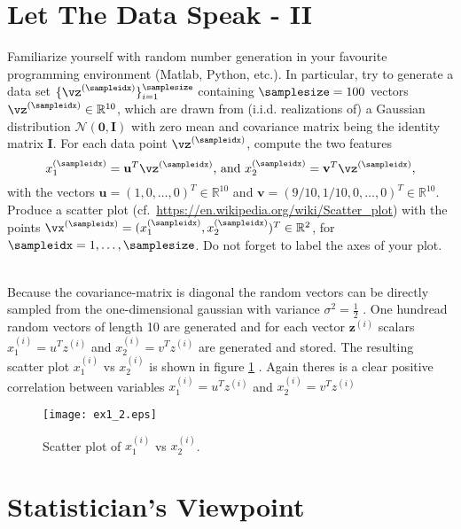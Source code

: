 \documentclass[article,11pt]{article}
\begin{document}
\newpage
\section{Let The Data Speak - II}
Familiarize yourself with random number generation in your favourite 
programming environment (Matlab, Python, etc.). In particular, try to generate a data set 
$\{ \vz^{(\sampleidx)} \}_{i=1}^{\samplesize}$ containing $\samplesize=100$ vectors $\vz^{(\sampleidx)} \in \mathbb{R}^{10}$, which 
are drawn from (i.i.d. realizations of) a Gaussian distribution $\mathcal{N}(\mathbf{0},\mathbf{I})$ with zero mean and covariance 
matrix being the identity matrix $\mathbf{I}$. For each data point $\vz^{(\sampleidx)}$, compute the two 
features 
\begin{equation}
x_{1}^{(\sampleidx)} = \mathbf{u}^{T} \vz^{(\sampleidx)} \mbox{, and } x_{2}^{(\sampleidx)}= \mathbf{v}^{T} \vz^{(\sampleidx)}, 
\end{equation}
with the vectors $\mathbf{u}\!=\!(1,0,\ldots,0)^{T}\in \mathbb{R}^{10}$ and $\mathbf{v}\!=\!(9/10,1/10,0,\ldots,0)^{T}\in \mathbb{R}^{10}$. 
Produce a scatter plot (cf.\ \url{https://en.wikipedia.org/wiki/Scatter_plot}) with the points 
$\vx^{(\sampleidx)}=(x^{(\sampleidx)}_{1},x^{(\sampleidx)}_{2})^{T} \in \mathbb{R}^{2}$, for $\sampleidx=1,\ldots,\samplesize$. 
Do not forget to label the axes of your plot. 


\\Because the covariance-matrix is diagonal the random vectors can be directly sampled from the one-dimensional gaussian with variance
$\sigma^2 = \frac{1}{2}$ . One hundread random vectors of length 10 are generated and for each vector $\mathbf{z}^{(i)}$ scalars $x_1^{(i)} = u^{T}z^{(i)}$ and
$x_2^{(i)} = v^{T}z^{(i)}$ are generated and stored. The resulting scatter plot
$x_1^{(i)}$ vs  $x_2^{(i)}$ is shown in figure \ref{fig:scatter_plot2} . Again theres is a clear positive correlation between variables $x_1^{(i)} = u^{T}z^{(i)}$
and $x_2^{(i)} = v^{T}z^{(i)}$
\begin{figure}[!b]
  \centering
  \texttt{[image: ex1\_2.eps]}
  \caption{Scatter plot of $x_1^{(i)}$ vs  $x_2^{(i)}$.}
  \label{fig:scatter_plot2}
\end{figure}


\newpage


\section{Statistician's Viewpoint}
\end{document}
